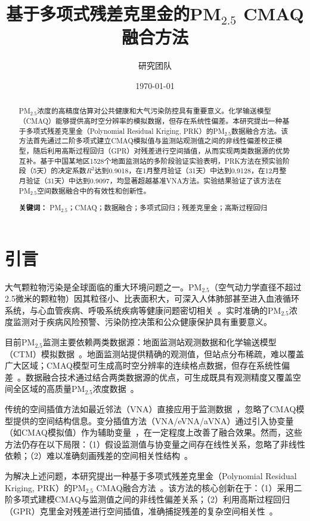 \documentclass[UTF8, a4paper, 12pt]{article}
\title{基于多项式残差克里金的PM$_{2.5}$ CMAQ融合方法}
\author{研究团队}
\date{\today}
\begin{document}
\maketitle

\begin{abstract}
PM$_{2.5}$浓度的高精度估算对公共健康和大气污染防控具有重要意义。化学输送模型（CMAQ）能够提供高时空分辨率的模拟数据，但存在系统性偏差。本研究提出一种基于多项式残差克里金（Polynomial Residual Kriging, PRK）的PM$_{2.5}$数据融合方法。该方法首先通过二阶多项式建立CMAQ模拟值与监测站观测值之间的非线性偏差校正模型，随后利用高斯过程回归（GPR）对残差进行空间插值，从而实现两类数据源的优势互补。基于中国某地区1528个地面监测站的多阶段验证实验表明，PRK方法在预实验阶段（5天）的决定系数$R^2$达到0.9018，在1月整月验证（31天）中达到0.9128，在12月整月验证（31天）中达到0.9097，均显著超越基准VNA方法。实验结果验证了该方法在PM$_{2.5}$空间数据融合中的有效性和创新性。

\textbf{关键词：} PM$_{2.5}$；CMAQ；数据融合；多项式回归；残差克里金；高斯过程回归
\end{abstract}

\section{引言}

大气颗粒物污染是全球面临的重大环境问题之一。PM$_{2.5}$（空气动力学直径不超过2.5微米的颗粒物）因其粒径小、比表面积大，可深入人体肺部甚至进入血液循环系统，与心血管疾病、呼吸系统疾病等健康问题密切相关~\cite{brooks2015review}。实时准确的PM$_{2.5}$浓度监测对于疾病风险预警、污染防控决策和公众健康保护具有重要意义。

目前PM$_{2.5}$监测主要依赖两类数据源：地面监测站观测数据和化学输送模型（CTM）模拟数据~\cite{zheng2020kriging}。地面监测站提供精确的观测值，但站点分布稀疏，难以覆盖广大区域；CMAQ模型可生成高时空分辨率的连续格点数据，但存在系统性偏差~\cite{foley2010CMAQ}。数据融合技术通过结合两类数据源的优点，可生成既具有观测精度又覆盖空间全区域的高质量PM$_{2.5}$浓度数据~\cite{reich2014ensemble}。

传统的空间插值方法如最近邻法（VNA）直接应用于监测数据~\cite{singh2019enhanced}，忽略了CMAQ模型提供的空间结构信息。变分插值方法（VNA/eVNA/aVNA）通过引入协变量（如CMAQ模拟值）作为辅助变量~\cite{liu2019spatial}，在一定程度上改善了融合效果。然而，这些方法仍存在以下局限：（1）假设监测值与协变量之间存在线性关系，忽略了非线性依赖；（2）难以准确刻画残差的空间相关性结构~\cite{cooley2007kriging}。

为解决上述问题，本研究提出一种基于多项式残差克里金（Polynomial Residual Kriging, PRK）的PM$_{2.5}$ CMAQ融合方法~\cite{wan2022fusion}。该方法的核心创新在于：（1）采用二阶多项式建模CMAQ与监测值之间的非线性偏差关系；（2）利用高斯过程回归（GPR）克里金对残差进行空间插值，准确捕捉残差的复杂空间相关性~\cite{rasmussen2006gaussian}。
\end{document}
